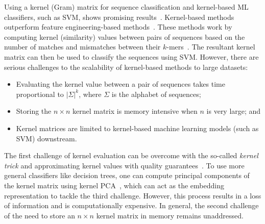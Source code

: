 \documentclass[runningheads]{llncs}
\begin{document}
Using a kernel (Gram) matrix for sequence classification and
kernel-based ML classifiers, such as SVM, shows promising
results~\cite{farhan2017efficient,ali2022efficient_tcbb}. Kernel-based methods outperform feature engineering-based
methods~\cite{ali2021k}. These methods work by computing kernel
(similarity) values between pairs of sequences based on the number of
matches and mismatches between their
$k$-mers~\cite{ali2022efficient_tcbb}. The resultant kernel
matrix can then be used to classify the sequences using SVM.
However, there are serious challenges to the scalability of kernel-based methods to large datasets:
\begin{itemize}
\item Evaluating the kernel value between a pair of sequences takes time proportional to $|\Sigma|^k$, where $\Sigma$ is the alphabet of sequences;
\item Storing the $n \times n$ kernel matrix is memory intensive
  when $n$ is very large; and
\item Kernel matrices are limited to kernel-based machine learning
  models (such as SVM) downstream.
\end{itemize}
The first challenge of kernel evaluation can be
overcome with the so-called \textit{kernel trick} and approximating kernel values with quality guarantees~\cite{farhan2017efficient}.  To use
more general classifiers like decision trees, one can compute principal components of the kernel matrix using kernel PCA~\cite{hoffmann2007kernel}, which
can act as the embedding representation to tackle the third challenge. However, this process 
results in a loss of information and is computationally
expensive.  In general, the second challenge of the need to store an $n
\times n$ kernel matrix in memory remains unaddressed.
\end{document}
